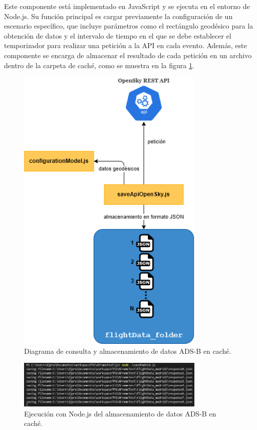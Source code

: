 \documentclass[a4paper, 11pt]{book}
\begin{document}
Este componente está implementado en JavaScript y se ejecuta en el entorno de Node.js. Su función principal es cargar previamente la configuración de un escenario específico, que incluye parámetros como el rectángulo geodésico para la obtención de datos y el intervalo de tiempo en el que se debe establecer el temporizador para realizar una petición a la API en cada evento. Además, este componente se encarga de almacenar el resultado de cada petición en un archivo dentro de la carpeta de caché, como se muestra en la figura \ref{fig:saveApiData}.
\begin{figure}[h]
  \centering
  \includegraphics[width=9cm, keepaspectratio]{img/almacenamientoCache.drawio.png}
  \caption{Diagrama de consulta y almacenamiento de datos ADS-B en caché.}
  \label{fig:saveApiData}
\end{figure}
\begin{figure}[h]
  \centering
  \includegraphics[width=9cm, keepaspectratio]{img/captura_datos_madrid.jpg}
  \caption{Ejecución con Node.js del almacenamiento de datos ADS-B en caché.}
  \label{fig:capturaDatosCache}
\end{figure}
\end{document}
